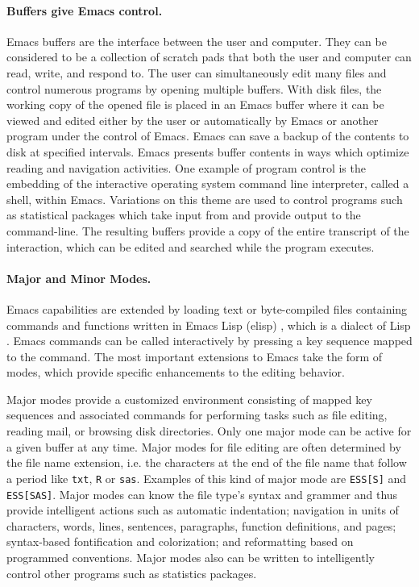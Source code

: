 \documentclass{article}
\newcommand{\stexttt}[1]{{\small\texttt{#1}}}
\begin{document}
\paragraph{Buffers give Emacs control.}
Emacs buffers are the interface between the user and computer.  They
can be considered to be a collection of scratch pads that both the
user and computer can read, write, and respond to.  The user can
simultaneously edit many files and control numerous programs by
opening multiple buffers.  With disk files, the working copy of the
opened file is placed in an Emacs buffer where it can be viewed and
edited either by the user or automatically by Emacs or another program
under the control of Emacs.  Emacs can save a backup of the contents
to disk at specified intervals.  Emacs presents buffer contents in
ways which optimize reading and navigation activities.  One example of
program control is the embedding of the interactive operating system
command line interpreter, called a shell, within Emacs.  Variations on
this theme are used to control programs such as statistical packages
which take input from and provide output to the command-line.  The
resulting buffers provide a copy of the entire transcript of the
interaction, which can be edited and searched while the program
executes.

\paragraph{Major and Minor Modes.}
Emacs capabilities are extended by loading text or byte-compiled files
containing commands and functions written in Emacs Lisp (elisp)
\citep{RChassell1999}, which is a dialect of Lisp
\citep{PGraham:1996}.  Emacs commands can be called interactively by
pressing a key sequence mapped to the command.
The most important extensions to Emacs take the form of modes, which
provide specific enhancements to the editing behavior.

Major modes provide a customized environment consisting of mapped key
sequences and associated commands for performing tasks such as file
editing, reading mail, or browsing disk directories.  Only one major
mode can be active for a given buffer at any time.  Major modes for
file editing are often determined by the file name extension, i.e.
the characters at the end of the file name that follow a period like
\stexttt{txt}, \stexttt{R} or \stexttt{sas}.  Examples of this kind of
major mode are \stexttt{ESS[S]} and \stexttt{ESS[SAS]}.  Major modes
can know the file type's syntax and grammer and thus provide intelligent
actions such as automatic indentation; navigation in units of
characters, words, lines, sentences, paragraphs, function definitions,
and pages; syntax-based fontification and colorization; and
reformatting based on programmed conventions.  Major modes also can be
written to intelligently control other programs such as statistics
packages.
\end{document}
